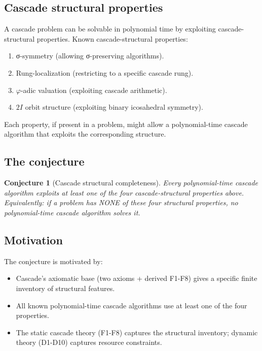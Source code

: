 \documentclass[11pt, a4paper]{amsart}
\newtheorem{conjecture}[theorem]{Conjecture}
\theoremstyle{definition}
\newcommand{\pphi}{\varphi}
\begin{document}
\subsection{Cascade structural properties}

A cascade problem can be solvable in polynomial time by exploiting
cascade-structural properties. Known cascade-structural properties:
\begin{enumerate}
\item σ-symmetry (allowing σ-preserving algorithms).
\item Rung-localization (restricting to a specific cascade rung).
\item $\pphi$-adic valuation (exploiting cascade arithmetic).
\item $2I$ orbit structure (exploiting binary icosahedral symmetry).
\end{enumerate}

Each property, if present in a problem, might allow a polynomial-time
cascade algorithm that exploits the corresponding structure.

\subsection{The conjecture}

\begin{conjecture}[Cascade structural completeness]\label{conj:completeness}
Every polynomial-time cascade algorithm exploits at least one of the
four cascade-structural properties above. Equivalently: if a problem
has NONE of these four structural properties, no polynomial-time cascade
algorithm solves it.
\end{conjecture}

\subsection{Motivation}

The conjecture is motivated by:
\begin{itemize}
\item Cascade's axiomatic base (two axioms + derived F1-F8) gives a
    specific finite inventory of structural features.
\item All known polynomial-time cascade algorithms use at least one
    of the four properties.
\item The static cascade theory (F1-F8) captures the structural
    inventory; dynamic theory (D1-D10) captures resource constraints.
\end{itemize}
\end{document}
